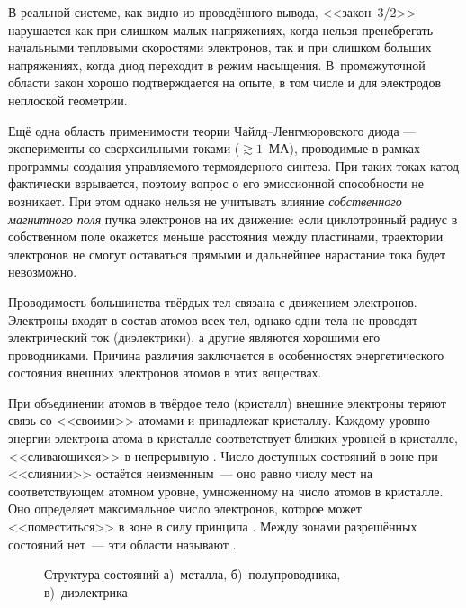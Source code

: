 В реальной системе, как видно из проведённого вывода, <<закон~3/2>>
нарушается как при слишком малых напряжениях, когда нельзя пренебрегать
начальными тепловыми скоростями электронов, так и при слишком больших
напряжениях, когда диод переходит в режим насыщения. В~промежуточной
области закон хорошо подтверждается на опыте, в том числе и для
электродов неплоской геометрии.

\begin{lab:note}
Ещё одна область применимости теории Чайлд--Ленгмюровского диода ---
эксперименты со сверхсильными токами ($\gtrsim 1$~МА),
проводимые в рамках программы создания управляемого
термоядерного синтеза. При таких токах катод фактически взрывается, поэтому
вопрос о его эмиссионной способности не возникает. При этом однако нельзя
не учитывать влияние \emph{собственного магнитного поля} пучка электронов
на их движение: если циклотронный радиус в собственном поле окажется
меньше расстояния между пластинами, траектории электронов не смогут
оставаться прямыми и дальнейшее нарастание тока будет невозможно.
\end{lab:note}



Проводимость большинства твёрдых тел связана с движением электронов. Электроны
входят в состав атомов всех тел, однако одни тела не проводят электрический ток
(диэлектрики), а другие являются хорошими его проводниками. Причина различия
заключается в особенностях энергетического состояния внешних электронов атомов в
этих веществах.



При объединении атомов в твёрдое тело (кристалл) внешние электроны теряют связь
со <<своими>> атомами и принадлежат  кристаллу.
Каждому уровню энергии электрона  атома в кристалле
соответствует  близких уровней в кристалле,
<<сливающихся>> в непрерывную .
Число доступных состояний в зоне при <<слиянии>> остаётся неизменным~--- оно
равно числу мест на соответствующем атомном уровне,
умноженному на число атомов в кристалле. Оно определяет максимальное число
электронов, которое может <<поместиться>> в зоне в силу принципа
. Между зонами разрешённых состояний нет~---
эти области называют .

\begin{wrapfigure}{o}{0.5\textwidth}
\centering
{}
\caption{Структура состояний а)~металла, б)~полупроводника, в)~диэлектрика}
\end{wrapfigure}

